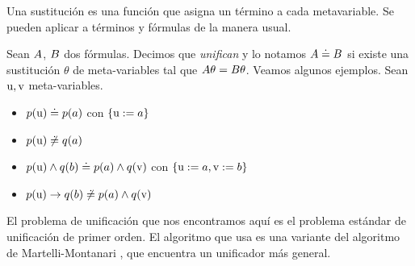 \begin{definition}[Sustitución]
    Una sustitución es una función que asigna un término a cada metavariable. Se pueden aplicar a términos y fórmulas de la manera usual.
\end{definition}
    
\begin{definition}[Unificación]
    Sean $A$, $B$ dos fórmulas. Decimos que \textit{unifican} y lo
    notamos $A \doteq B$ si existe una sustitución $\theta$ de
    meta-variables tal que $A\theta = B\theta$. Veamos algunos ejemplos. Sean $\textrm{u}, \textrm{v}$ meta-variables.

    \begin{itemize}
    \item $p(\textrm{u}) \doteq p(a)$ con $\{\textrm{u} := a\}$
        \item $p(\textrm{u}) \not\doteq q(a)$
        \item $p(\textrm{u}) \wedge q(b) \doteq p(a) \wedge q(\textrm{v})$
        con $\{\textrm{u} := a, \textrm{v} := b\}$
        \item $p(\textrm{u}) \to q(b) \not\doteq p(a) \wedge q(\textrm{v})$
    \end{itemize}    
\end{definition}

\begin{obs*}
    El problema de unificación que nos encontramos aquí es el problema estándar de unificación de primer orden. El algoritmo que usa \ppaTool{} es una variante del algoritmo de Martelli-Montanari \cite{martelli-montanari-unification}, que encuentra un unificador más general.
\end{obs*}

